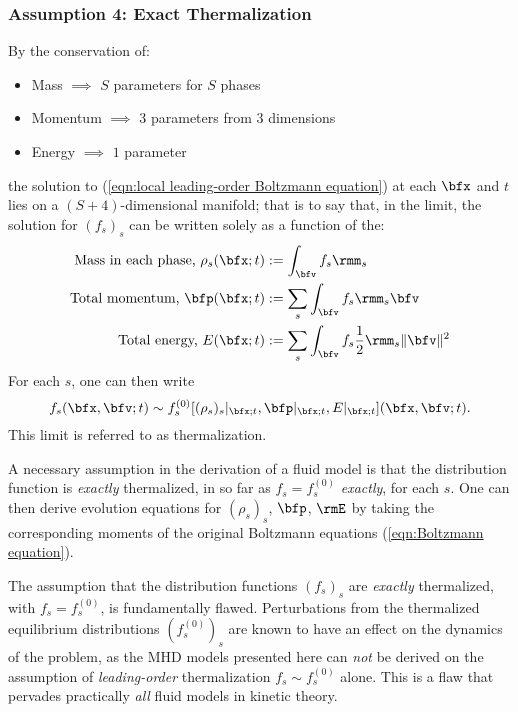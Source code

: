 \subsubsection*{Assumption 4: Exact Thermalization}
    By the conservation of:
    \begin{itemize}
        \item  Mass $\implies$ $S$ parameters for $S$ phases
        \item  Momentum $\implies$ $3$ parameters from $3$ dimensions
        \item  Energy $\implies$ $1$ parameter
    \end{itemize}
    the solution to (\ref{eqn:local leading-order Boltzmann equation}) at each $\bfx$ and $t$ lies on a $(S + 4)$-dimensional manifold; that is to say that, in the limit, the solution for $(f_{s})_{s}$ can be written solely as a function of the:
    \begin{align}
        \text{Mass in each phase, }  \rho_{s}(\bfx; t)  &:=  \int_{\bfv}f_{s}\rmm_{s}  \\
        \text{Total momentum, }          \bfp(\bfx; t)  &:=  \sum_{s}\int_{\bfv}f_{s}\rmm_{s}\bfv  \\
        \text{Total energy, }               E(\bfx; t)  &:=  \sum_{s}\int_{\bfv}f_{s}\frac{1}{2}\rmm_{s}\|\bfv\|^{2}
    \end{align}
    For each $s$, one can then write
    \begin{equation}
        f_{s}(\bfx, \bfv; t)  \sim  f_{s}^{(0)}[(\rho_{s})_{s}|_{\bfx; t}, \bfp|_{\bfx; t}, E|_{\bfx; t}](\bfx, \bfv; t).
    \end{equation}
    This limit is referred to as thermalization.
    
    A necessary assumption in the derivation of a fluid model is that the distribution function is \emph{exactly} thermalized, in so far as $f_{s}  =  f_{s}^{(0)}$ \emph{exactly}, for each $s$. One can then derive evolution equations for $(\rho_{s})_{s}$, $\bfp$, $\rmE$ by taking the corresponding moments of the original Boltzmann equations (\ref{eqn:Boltzmann equation}).

    \begin{remark}
        The assumption that the distribution functions $(f_{s})_{s}$ are \emph{exactly} thermalized, with $f_{s}  =  f_{s}^{(0)}$, is fundamentally flawed. Perturbations from the thermalized equilibrium distributions $(f_{s}^{(0)})_{s}$ are known to have an effect on the dynamics of the problem, as the MHD models presented here can \emph{not} be derived on the assumption of \emph{leading-order} thermalization $f_{s}  \sim  f_{s}^{(0)}$ alone. \BA{[Ref]} This is a flaw that pervades practically \emph{all} fluid models in kinetic theory.
    \end{remark}

